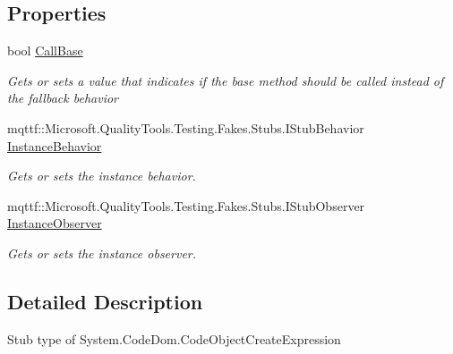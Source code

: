 \subsection*{Properties}
\begin{DoxyCompactItemize}
\item 
bool \hyperlink{class_system_1_1_code_dom_1_1_fakes_1_1_stub_code_object_create_expression_a2671c7ec2eac545e34cb842a1f87a16d}{Call\-Base}
\begin{DoxyCompactList}\small\item\em Gets or sets a value that indicates if the base method should be called instead of the fallback behavior\end{DoxyCompactList}\item 
mqttf\-::\-Microsoft.\-Quality\-Tools.\-Testing.\-Fakes.\-Stubs.\-I\-Stub\-Behavior \hyperlink{class_system_1_1_code_dom_1_1_fakes_1_1_stub_code_object_create_expression_a1b8d2a75df9a6f0a97149bcaba7037f6}{Instance\-Behavior}
\begin{DoxyCompactList}\small\item\em Gets or sets the instance behavior.\end{DoxyCompactList}\item 
mqttf\-::\-Microsoft.\-Quality\-Tools.\-Testing.\-Fakes.\-Stubs.\-I\-Stub\-Observer \hyperlink{class_system_1_1_code_dom_1_1_fakes_1_1_stub_code_object_create_expression_a5bc5f4d5b45a4ce5ea35da2b6e0f2ab7}{Instance\-Observer}
\begin{DoxyCompactList}\small\item\em Gets or sets the instance observer.\end{DoxyCompactList}\end{DoxyCompactItemize}


\subsection{Detailed Description}
Stub type of System.\-Code\-Dom.\-Code\-Object\-Create\-Expression



